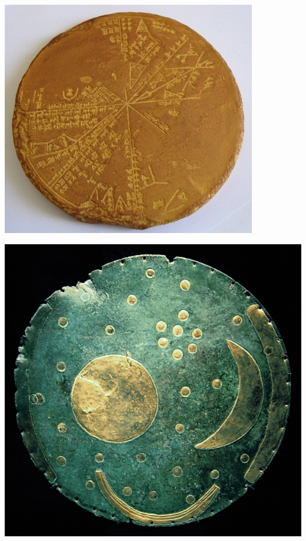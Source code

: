 \begin{multicols}{2}
	\begin{center}
	\includegraphics[width=\linewidth]{./IMG/tumblr_meje4cXeVb1qfub7eo1_500.jpg}
\end{center}

\vfill
\columnbreak

\begin{center}
	\includegraphics[width=\linewidth]{./IMG/nebra-scheibe.jpg}
\end{center}

\end{multicols}

